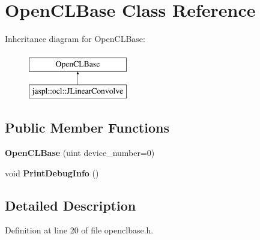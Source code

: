\hypertarget{class_open_c_l_base}{}\section{Open\+C\+L\+Base Class Reference}
\label{class_open_c_l_base}
Inheritance diagram for Open\+C\+L\+Base\+:\begin{figure}[H]
\begin{center}
\leavevmode
\includegraphics[height=2.000000cm]{class_open_c_l_base}
\end{center}
\end{figure}
\subsection*{Public Member Functions}
\begin{DoxyCompactItemize}
\item 
{\bfseries Open\+C\+L\+Base} (uint device\+\_\+number=0)\hypertarget{class_open_c_l_base_a800c1a56b9bb426cff09fd738b8ac5cc}{}\label{class_open_c_l_base_a800c1a56b9bb426cff09fd738b8ac5cc}

\item 
void {\bfseries Print\+Debug\+Info} ()\hypertarget{class_open_c_l_base_ad526fef24d45bb5813136c90e00b4c39}{}\label{class_open_c_l_base_ad526fef24d45bb5813136c90e00b4c39}

\end{DoxyCompactItemize}


\subsection{Detailed Description}


Definition at line 20 of file openclbase.\+h.

